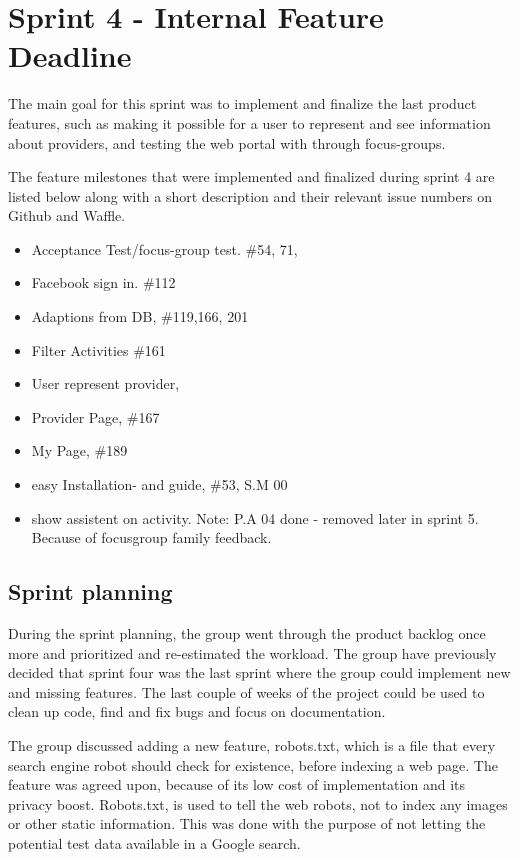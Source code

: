 \section{Sprint 4 - Internal Feature Deadline}
\label{sprint4}
The main goal for this sprint was to implement and finalize the last product features, such as making it possible for a user to represent and see information about providers, and testing the web portal with through focus-groups.  

The feature milestones that were implemented and finalized during sprint 4 are listed below along with a short description and their relevant issue numbers on Github and Waffle.

\begin{itemize}
    \item Acceptance Test/focus-group test. \#54, 71, 
    \item Facebook sign in. \#112 
    \item Adaptions from DB, \#119,166, 201 
    \item Filter Activities \#161
    \item User represent provider, 
    \item Provider Page, \#167
    \item My Page, \#189
    \item easy Installation- and guide, \#53, S.M 00
    \item show assistent on activity. Note: P.A 04 done - removed later in sprint 5. Because of focusgroup family feedback.
\end{itemize}

\subsection{Sprint planning}
During the sprint planning, the group went through the product backlog once more and prioritized and re-estimated the workload. The group have previously decided that sprint four was the last sprint where the group could implement new and missing features. The last couple of weeks of the project could be used to clean up code, find and fix bugs and focus on documentation. 

The group discussed adding a new feature, robots.txt, which is a file that every search engine robot should check for existence, before indexing a web page. The feature was agreed upon, because of its low cost of implementation and its privacy boost. Robots.txt, is used to tell the web robots, not to index any images or other static information. This was done with the purpose of not letting the potential test data available in a Google search.

